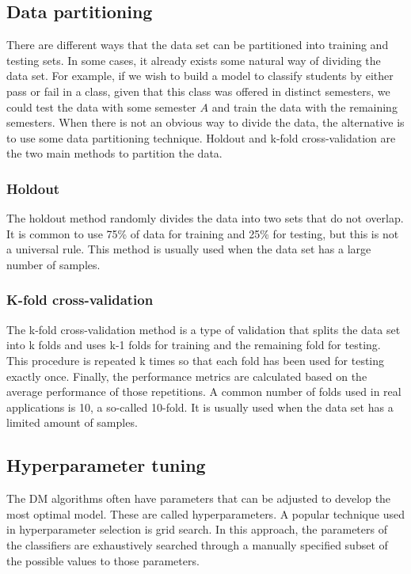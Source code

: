 \subsection{Data partitioning}
\label{sc:dp}

There are different ways that the data set can be partitioned into training and testing sets. In some cases, it already exists some natural way of dividing the data set. For example, if we wish to build a model to classify students by either pass or fail in a class, given that this class was offered in distinct semesters, we could test the data with some semester $A$ and train the data with the remaining semesters. When there is not an obvious way to divide the data, the alternative is to use some data partitioning technique. Holdout and k-fold cross-validation are the two main methods to partition the data.

\subsubsection{Holdout}

The holdout method randomly divides the data into two sets that do not overlap. It is common to use 75\% of data for training and 25\% for testing, but this is not a universal rule. This method is usually used when the data set has a large number of samples.

\subsubsection{K-fold cross-validation}

The k-fold cross-validation method is a type of validation that splits the data set into k folds and uses k-1 folds for training and the remaining fold for testing. This procedure is repeated k times so that each fold has been used for testing exactly once. Finally, the performance metrics are calculated based on the average performance of those repetitions. A common number of folds used in real applications is 10, a so-called 10-fold. It is usually used when the data set has a limited amount of samples.

\subsection{Hyperparameter tuning}
\label{sc:ht}

The DM algorithms often have parameters that can be adjusted to develop the most optimal model. These are called hyperparameters. A popular technique used in hyperparameter selection is grid search. In this approach, the parameters of the classifiers are exhaustively searched through a manually specified subset of the possible values to those parameters.

